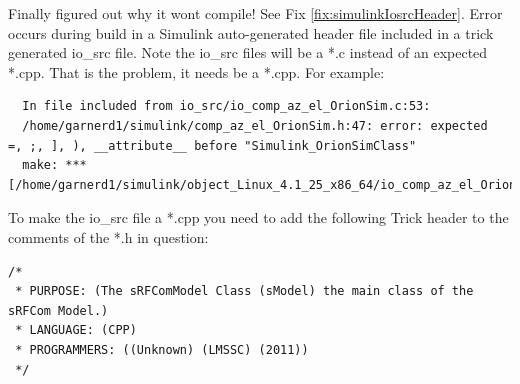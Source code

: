       \itm Finally figured out why it wont compile! See Fix \ref{fix:simulinkIosrcHeader}.
    \enit
    \fix{Error: expected =, ;, ], ) or \_\_attribute\_\_ before `Simulink\_Class'}{simulinkIosrcHeader}
      Error occurs during build in a Simulink auto-generated header file included in a trick generated
      io\_src file. Note the io\_src files will be a *.c instead of an expected *.cpp. That is the problem, it needs
      be a *.cpp. For example:
\begin{verbatim}
  In file included from io_src/io_comp_az_el_OrionSim.c:53:
  /home/garnerd1/simulink/comp_az_el_OrionSim.h:47: error: expected  =, ;, ], ), __attribute__ before "Simulink_OrionSimClass"
  make: *** [/home/garnerd1/simulink/object_Linux_4.1_25_x86_64/io_comp_az_el_OrionSim.c]
\end{verbatim}
      To make the io\_src file a *.cpp you need to add the following Trick header to the comments of the *.h
      in question:
\begin{verbatim}
/*
 * PURPOSE: (The sRFComModel Class (sModel) the main class of the sRFCom Model.)
 * LANGUAGE: (CPP)
 * PROGRAMMERS: ((Unknown) (LMSSC) (2011))
 */
\end{verbatim}

